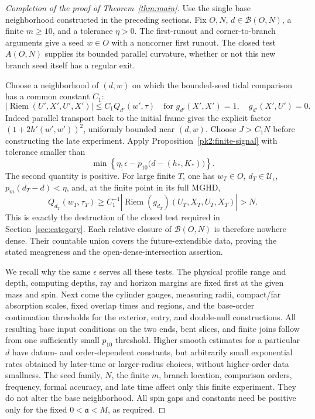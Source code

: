 \begin{proof}[Completion of the proof of Theorem~\ref{thm:main}]
Use the single base neighborhood constructed in the preceding
sections. Fix $O,N$, $d\in\mathcal B(O,N)$, a finite $m\ge10$,
and a tolerance $\eta>0$. The first-runout and corner-to-branch
arguments give a seed $w\in O$ with a noncorner first runout.
The closed test $A(O,N)$ supplies its bounded parallel curvature,
whether or not this new branch seed itself has a regular exit.

Choose a neighborhood of $(d,w)$ on which the bounded-seed tidal
comparison has a common constant $C_1$:
\[
 |\operatorname{Riem}(U',X',U',X')|
   \le C_1Q_{d'}(w',\tau)
 \quad\text{for }g_{d'}(X',X')=1,\quad g_{d'}(X',U')=0.
\]
Indeed parallel transport back to the initial frame gives the
explicit factor $(1+2h'(w',w'))^2$, uniformly bounded near $(d,w)$.
Choose $J>C_1N$ before constructing the late experiment. Apply
Proposition~\ref{pk2:finite-signal} with tolerance smaller than
\[
 \min\left\{\eta,
    \epsilon-p_{10}\bigl(d-(h_*,K_*)\bigr)\right\}.
\]
The second quantity is positive. For large finite $T$, one has
$w_T\in O$, $d_T\in\mathcal U_\epsilon$, $p_m(d_T-d)<\eta$, and, at
the finite point in its full MGHD,
\[
 Q_{d_T}(w_T,\tau_T)
 \ge C_1^{-1}
   |\operatorname{Riem}(g_{d_T})(U_T,X_T,U_T,X_T)|>N.
\]
This is exactly the destruction of the closed test required in
Section~\ref{sec:category}. Each relative closure of
$\mathcal B(O,N)$ is therefore nowhere dense. Their countable
union covers the future-extendible data, proving the stated
meagreness and the open-dense-intersection assertion.

We recall why the same $\epsilon$ serves all these tests. The
physical profile range and depth, computing depths, ray and
horizon margins are fixed first at the given mass and spin.
Next come the cylinder gauges, measuring radii, compact/far
absorption scales, fixed overlap times and regions, and the
base-order continuation thresholds for the exterior, entry,
and double-null constructions. All resulting base input
conditions on the two ends, bent slices, and finite joins follow
from one sufficiently small $p_{10}$ threshold. Higher smooth
estimates for a particular $d$ have datum- and order-dependent
constants, but arbitrarily small exponential rates obtained by
later-time or larger-radius choices, without higher-order data
smallness. The seed family, $N$, the finite $m$, branch location,
comparison orders, frequency, formal accuracy, and late time
affect only this finite experiment. They do not alter the base
neighborhood. All spin gaps and constants need be positive only
for the fixed $0<\mathfrak a<M$, as required.
\end{proof}
